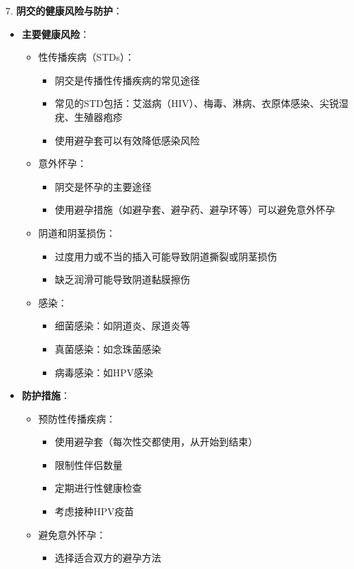\documentclass[12pt,UTF8]{ctexbook}
\begin{document}
7. \textbf{阴交的健康风险与防护}：
\begin{itemize}
	\item \textbf{主要健康风险}：
	\begin{itemize}
		\item 性传播疾病（STDs）：
		\begin{itemize}
			\item 阴交是传播性传播疾病的常见途径
			\item 常见的STD包括：艾滋病（HIV）、梅毒、淋病、衣原体感染、尖锐湿疣、生殖器疱疹
			\item 使用避孕套可以有效降低感染风险
		\end{itemize}
		\item 意外怀孕：
		\begin{itemize}
			\item 阴交是怀孕的主要途径
			\item 使用避孕措施（如避孕套、避孕药、避孕环等）可以避免意外怀孕
		\end{itemize}
		\item 阴道和阴茎损伤：
		\begin{itemize}
			\item 过度用力或不当的插入可能导致阴道撕裂或阴茎损伤
			\item 缺乏润滑可能导致阴道黏膜擦伤
		\end{itemize}
		\item 感染：
		\begin{itemize}
			\item 细菌感染：如阴道炎、尿道炎等
			\item 真菌感染：如念珠菌感染
			\item 病毒感染：如HPV感染
		\end{itemize}
	\end{itemize}
	\item \textbf{防护措施}：
	\begin{itemize}
		\item 预防性传播疾病：
		\begin{itemize}
			\item 使用避孕套（每次性交都使用，从开始到结束）
			\item 限制性伴侣数量
			\item 定期进行性健康检查
			\item 考虑接种HPV疫苗
		\end{itemize}
		\item 避免意外怀孕：
		\begin{itemize}
			\item 选择适合双方的避孕方法

\end{itemize}
\end{itemize}
\end{itemize}
\end{document}
